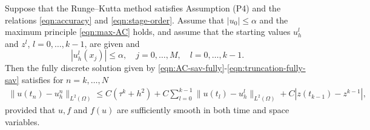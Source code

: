 
\begin{theorem}\label{thm:sav-error}
Suppose that the Runge--Kutta method satisfies Assumption (P4) and the relations \eqref{eqn:accuracy} and \eqref{eqn:stage-order}.
Assume that $|u_0| \le \alpha$ and the maximum principle \eqref{eqn:max-AC} holds,
and assume that the starting values $u_h^l$ and $z^l$, $l=0,\dots,k-1$, are given and
$$
|u_h^l(x_j)|\le \alpha , \quad j=0,\dots,M,\quad l=0,\dots,k-1.
$$
Then the   {fully discrete} solution given by \eqref{eqn:AC-sav-fully}-\eqref{eqn:truncation-fully-sav} satisfies
{for $n=k,\ldots,N$}
\begin{align}\label{fully-err-AC}
  \| u(t_n) - u_h^n \|_{L^2(\Omega)} \le  C(\tau^k + h^{2}) + C\sum_{l=0}^{k-1}
  \| u(t_l) - u_h^l \|_{L^2(\Omega)} + C|z(t_{k-1}) - z^{k-1}| ,
\end{align}
provided that $u, f$ and $f(u)$ are sufficiently smooth in both time and space variables.
\end{theorem}

